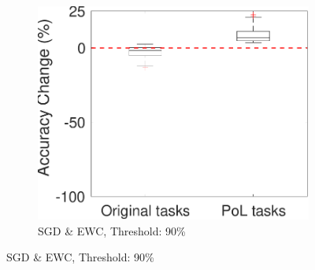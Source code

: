 \begin{figure}[!t]
\begin{subfigure}{.3\textwidth}
        \includegraphics[width=1\textwidth]{other/figures/90-117-4_v3.pdf}
        \caption{SGD \& EWC, Threshold: 90\%}
        \label{90_box}
    \end{subfigure}
    

\end{figure}
